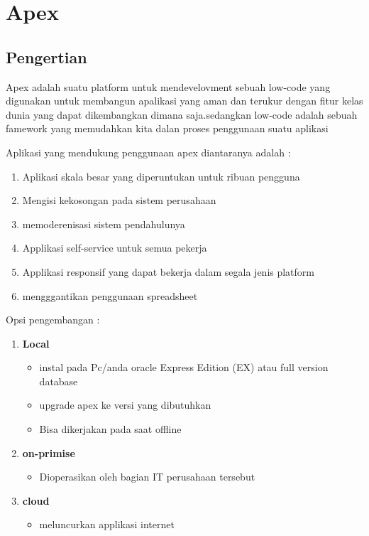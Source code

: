 \chapter{Apex}
\section{Pengertian}
Apex adalah suatu platform untuk mendevelovment sebuah low-code yang digunakan untuk membangun apalikasi yang aman dan terukur dengan fitur kelas dunia yang dapat dikembangkan dimana saja.sedangkan low-code adalah sebuah famework yang memudahkan kita dalan proses penggunaan suatu aplikasi
\par Aplikasi yang mendukung penggunaan apex diantaranya adalah :
\begin{enumerate}
\item Aplikasi skala besar yang diperuntukan untuk ribuan pengguna 
\item Mengisi kekosongan pada sistem perusahaan
\item memoderenisasi sistem pendahulunya
\item Applikasi self-service untuk semua pekerja
\item Applikasi responsif  yang dapat bekerja dalam segala jenis platform
\item mengggantikan penggunaan spreadsheet
\end{enumerate}

Opsi pengembangan :
\begin{enumerate}
\item \textbf {Local}
\begin{itemize}
\item instal pada Pc/anda oracle Express Edition (EX) atau full version database
\item upgrade apex ke versi yang dibutuhkan 
\item Bisa dikerjakan pada saat offline
\end{itemize}

\item \textbf{on-primise}
\begin{itemize}
\item Dioperasikan oleh bagian  IT perusahaan tersebut 
\end{itemize}

\item \textbf{cloud}
\begin{itemize}
\item meluncurkan applikasi internet
\end{itemize}
\end{enumerate}


